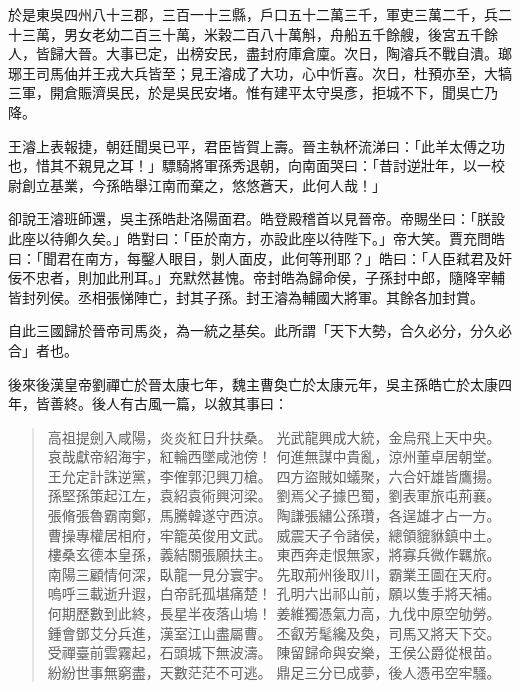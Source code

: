 於是東吳四州八十三郡，三百一十三縣，戶口五十二萬三千，軍吏三萬二千，兵二十三萬，男女老幼二百三十萬，米榖二百八十萬斛，舟船五千餘艘，後宮五千餘人，皆歸大晉。大事已定，出榜安民，盡封府庫倉廩。次日，陶濬兵不戰自潰。瑯琊王司馬伷并王戎大兵皆至；見王濬成了大功，心中忻喜。次日，杜預亦至，大犒三軍，開倉賑濟吳民，於是吳民安堵。惟有建平太守吳彥，拒城不下，聞吳亡乃降。

王濬上表報捷，朝廷聞吳已平，君臣皆賀上壽。晉主執杯流涕曰：「此羊太傅之功也，惜其不親見之耳！」驃騎將軍孫秀退朝，向南面哭曰：「昔討逆壯年，以一校尉創立基業，今孫皓舉江南而棄之，悠悠蒼天，此何人哉！」

卻說王濬班師還，吳主孫皓赴洛陽面君。皓登殿稽首以見晉帝。帝賜坐曰：「朕設此座以待卿久矣。」皓對曰：「臣於南方，亦設此座以待陛下。」帝大笑。賈充問皓曰：「聞君在南方，每鑿人眼目，剝人面皮，此何等刑耶？」皓曰：「人臣弒君及奸佞不忠者，則加此刑耳。」充默然甚愧。帝封皓為歸命侯，子孫封中郎，隨降宰輔皆封列侯。丞相張悌陣亡，封其子孫。封王濬為輔國大將軍。其餘各加封賞。

自此三國歸於晉帝司馬炎，為一統之基矣。此所謂「天下大勢，合久必分，分久必合」者也。

後來後漢皇帝劉禪亡於晉太康七年，魏主曹奐亡於太康元年，吳主孫皓亡於太康四年，皆善終。後人有古風一篇，以敘其事曰：

\begin{quote}
高祖提劍入咸陽，炎炎紅日升扶桑。
光武龍興成大統，金烏飛上天中央。
哀哉獻帝紹海宇，紅輪西墜咸池傍！
何進無謀中貴亂，涼州董卓居朝堂。
王允定計誅逆黨，李傕郭氾興刀槍。
四方盜賊如蟻聚，六合奸雄皆鷹揚。
孫堅孫策起江左，袁紹袁術興河梁。
劉焉父子據巴蜀，劉表軍旅屯荊襄。
張脩張魯霸南鄭，馬騰韓遂守西涼。
陶謙張繡公孫瓚，各逞雄才占一方。
曹操專權居相府，牢籠英俊用文武。
威震天子令諸侯，總領貔貅鎮中土。
樓桑玄德本皇孫，義結關張願扶主。
東西奔走恨無家，將寡兵微作羈旅。
南陽三顧情何深，臥龍一見分寰宇。
先取荊州後取川，霸業王圖在天府。
嗚呼三載逝升遐，白帝託孤堪痛楚！
孔明六出祁山前，願以隻手將天補。
何期歷數到此終，長星半夜落山塢！
姜維獨憑氣力高，九伐中原空劬勞。
鍾會鄧艾分兵進，漢室江山盡屬曹。
丕叡芳髦纔及奐，司馬又將天下交。
受禪臺前雲霧起，石頭城下無波濤。
陳留歸命與安樂，王侯公爵從根苗。
紛紛世事無窮盡，天數茫茫不可逃。
鼎足三分已成夢，後人憑弔空牢騷。
\end{quote}

